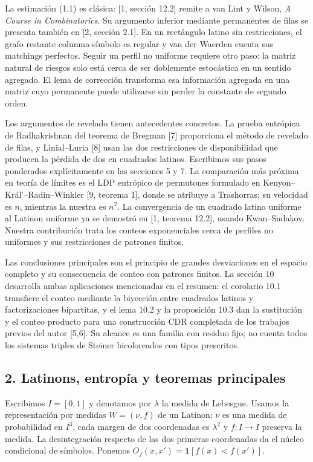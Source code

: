 \documentclass[spanish,11pt,a4paper]{article}
\begin{document}
La estimación (1.1) es clásica: {[}1, sección 12.2{]} remite a van Lint y Wilson, \emph{A Course in Combinatorics}. Su argumento inferior mediante permanentes de filas se presenta también en {[}2, sección 2.1{]}. En un rectángulo latino sin restricciones, el grafo restante columna-símbolo es regular y van der Waerden cuenta sus matchings perfectos. Seguir un perfil no uniforme requiere otro paso: la matriz natural de riesgos solo está cerca de ser doblemente estocástica en un sentido agregado. El lema de corrección transforma esa información agregada en una matriz cuyo permanente puede utilizarse sin perder la constante de segundo orden.

Los argumentos de revelado tienen antecedentes concretos. La prueba entrópica de Radhakrishnan del teorema de Bregman {[}7{]} proporciona el método de revelado de filas, y Linial--Luria {[}8{]} usan las dos restricciones de disponibilidad que producen la pérdida de dos en cuadrados latinos. Escribimos sus pasos ponderados explícitamente en las secciones 5 y 7. La comparación más próxima en teoría de límites es el LDP entrópico de permutones formulado en Kenyon--Král'--Radin--Winkler {[}9, teorema 1{]}, donde se atribuye a Trashorras; su velocidad es \(n\), mientras la nuestra es \(n^2\). La convergencia de un cuadrado latino uniforme al Latinon uniforme ya se demostró en {[}1, teorema 12.2{]}, usando Kwan--Sudakov. Nuestra contribución trata los conteos exponenciales cerca de perfiles no uniformes y sus restricciones de patrones finitos.

Las conclusiones principales son el principio de grandes desviaciones en el espacio completo y su consecuencia de conteo con patrones finitos. La sección 10 desarrolla ambas aplicaciones mencionadas en el resumen: el corolario 10.1 transfiere el conteo mediante la biyección entre cuadrados latinos y factorizaciones bipartitas, y el lema 10.2 y la proposición 10.3 dan la sustitución y el conteo producto para una construcción CDR completada de los trabajos previos del autor {[}5,6{]}. Su alcance es una familia con residuo fijo; no cuenta todos los sistemas triples de Steiner bicoloreados con tipos prescritos.

\subsection{2. Latinons, entropía y teoremas principales}\label{latinons-entropuxeda-y-teoremas-principales}

Escribimos \(I=[0,1]\) y denotamos por \(\lambda\) la medida de Lebesgue. Usamos la representación por medidas \(W=(\nu,f)\) de un Latinon: \(\nu\) es una medida de probabilidad en \(I^3\), cada margen de dos coordenadas es \(\lambda^2\) y \(f:I\to I\) preserva la medida. La desintegración respecto de las dos primeras coordenadas da el núcleo condicional de símbolos. Ponemos \(O_f(x,x')=\mathbf1[f(x)<f(x')]\).
\end{document}
